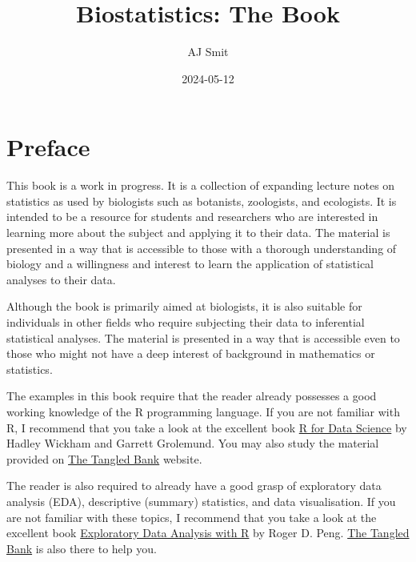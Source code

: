 \documentclass[
  letterpaper,
]{book}
\title{Biostatistics: The Book}
\author{AJ Smit}
\date{2024-05-12}
\renewcommand*\contentsname{Table of contents}
\newcommand\contentsname{Table of contents}
\begin{document}
\frontmatter
\maketitle

\renewcommand*\contentsname{Table of contents}
{
\hypersetup{linkcolor=blue}
\setcounter{tocdepth}{2}
\tableofcontents
}
\listoffigures
\listoftables

\mainmatter
{}

\chapter*{Preface}\label{preface}


This book is a work in progress. It is a collection of expanding lecture
notes on statistics as used by biologists such as botanists, zoologists,
and ecologists. It is intended to be a resource for students and
researchers who are interested in learning more about the subject and
applying it to their data. The material is presented in a way that is
accessible to those with a thorough understanding of biology and a
willingness and interest to learn the application of statistical
analyses to their data.

Although the book is primarily aimed at biologists, it is also suitable
for individuals in other fields who require subjecting their data to
inferential statistical analyses. The material is presented in a way
that is accessible even to those who might not have a deep interest of
background in mathematics or statistics.

The examples in this book require that the reader already possesses a
good working knowledge of the R programming language. If you are not
familiar with R, I recommend that you take a look at the excellent book
\href{https://r4ds.had.co.nz/}{R for Data Science} by Hadley Wickham and
Garrett Grolemund. You may also study the material provided on
\href{https://tangledbank.netlify.app}{The Tangled Bank} website.

The reader is also required to already have a good grasp of exploratory
data analysis (EDA), descriptive (summary) statistics, and data
visualisation. If you are not familiar with these topics, I recommend
that you take a look at the excellent book
\href{https://bookdown.org/rdpeng/exdata/}{Exploratory Data Analysis
with R} by Roger D. Peng. \href{https://tangledbank.netlify.app}{The
Tangled Bank} is also there to help you.
\end{document}
